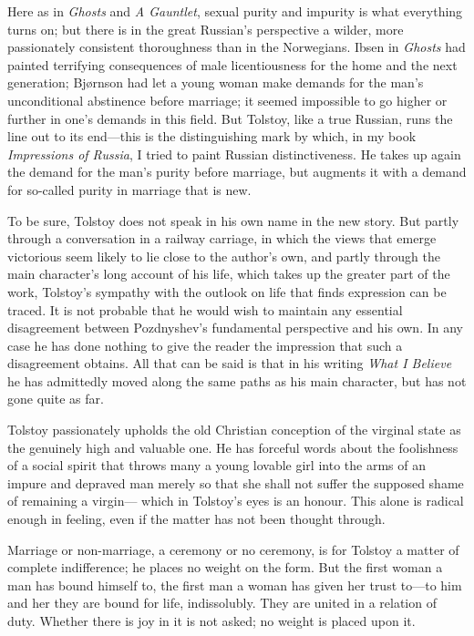 \documentclass[12pt,a4paper]{article}
\begin{document}
Here as in \textit{Ghosts} and \textit{A Gauntlet}, sexual purity and
impurity is what everything turns on; but there is in the great
Russian's perspective a wilder, more passionately consistent
thoroughness than in the Norwegians. Ibsen in \textit{Ghosts} had
painted terrifying consequences of male licentiousness for the home
and the next generation; Bjørnson had let a young woman make demands
for the man's unconditional abstinence before marriage; it seemed
impossible to go higher or further in one's demands in this field.
But Tolstoy, like a true Russian, runs the line out to its end---this
is the distinguishing mark by which, in my book \textit{Impressions of
Russia}, I tried to paint Russian distinctiveness. He takes up again
the demand for the man's purity before marriage, but augments it with
a demand for so-called purity in marriage that is new.

To be sure, Tolstoy does not speak in his own name in the new story.
But partly through a conversation in a railway carriage, in which the
views that emerge victorious seem likely to lie close to the author's
own, and partly through the main character's long account of his life,
which takes up the greater part of the work, Tolstoy's sympathy with
the outlook on life that finds expression can be traced. It is not
probable that he would wish to maintain any essential disagreement
between Pozdnyshev's fundamental perspective and his own. In any case
he has done nothing to give the reader the impression that such a
disagreement obtains. All that can be said is that in his writing
\textit{What I Believe} he has admittedly moved along the same paths
as his main character, but has not gone quite as far.

Tolstoy passionately upholds the old Christian conception of the
virginal state as the genuinely high and valuable one. He has forceful
words about the foolishness of a social spirit that throws many a young
lovable girl into the arms of an impure and depraved man merely so
that she shall not suffer the supposed shame of remaining a virgin---
which in Tolstoy's eyes is an honour. This alone is radical enough in
feeling, even if the matter has not been thought through.

Marriage or non-marriage, a ceremony or no ceremony, is for Tolstoy
a matter of complete indifference; he places no weight on the form.
But the first woman a man has bound himself to, the first man a woman
has given her trust to---to him and her they are bound for life,
indissolubly. They are united in a relation of duty. Whether there is
joy in it is not asked; no weight is placed upon it.
\end{document}
